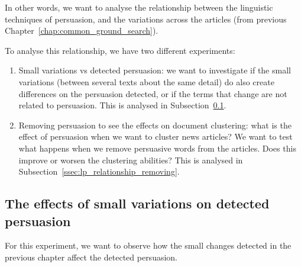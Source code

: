 In other words, we want to analyse the relationship between the linguistic techniques of persuasion, and the variations across the articles (from previous Chapter~\ref{chap:common_ground_search}).

To analyse this relationship, we have two different experiments:

\begin{enumerate}
    \item Small variations vs detected persuasion: we want to investigate if the small variations (between several texts about the same detail) do also create differences on the persuasion detected, or if the terms that change are not related to persuasion. This is analysed in Subsection~\ref{ssec:lp_relationship_small_variations}.
    \item Removing persuasion to see the effects on document clustering: what is the effect of persuasion when we want to cluster news articles? We want to test what happens when we remove persuasive words from the articles. Does this improve or worsen the clustering abilities? This is analysed in Subsection~\ref{ssec:lp_relationship_removing}. %
\end{enumerate}

\subsection{\statusgreen The effects of small variations on detected persuasion}
\label{ssec:lp_relationship_small_variations}



For this experiment, we want to observe how the small changes detected in the previous chapter affect the detected persuasion.

